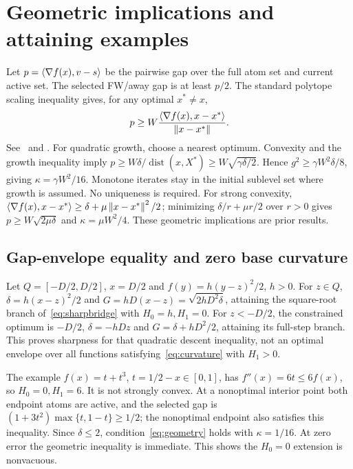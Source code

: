 \section{Geometric implications and attaining examples}
\label{app:geometry}
Let $p=\left\langle\nabla f(x),v-s\right\rangle$ be the pairwise gap over the full
atom set and current active set. The selected FW/away gap is at
least $p/2$. The standard polytope scaling inequality gives, for
any optimal $x^*\ne x$,
\[
 p\ge W\frac{\left\langle\nabla f(x),x-x^*\right\rangle}{\left\|x-x^*\right\|}.
\]
See~\cite[Theorem 3]{lacostejaggi} and
\cite[Lemmas 3.4 and 3.6]{restartfw}. For quadratic growth, choose
a nearest optimum. Convexity and the growth inequality imply
$p\ge W\delta/\operatorname{dist}(x,X^*)
\ge W\sqrt{\gamma\delta/2}$. Hence
$g^2\ge\gamma W^2\delta/8$, giving $\kappa=\gamma W^2/16$.
Monotone iterates stay in the initial sublevel set where growth is
assumed. No uniqueness is required. For strong convexity,
$\left\langle\nabla f(x),x-x^*\right\rangle\ge\delta+\mu\left\|x-x^*\right\|^2/2$;
minimizing $\delta/r+\mu r/2$ over $r>0$ gives
$p\ge W\sqrt{2\mu\delta}$ and $\kappa=\mu W^2/4$.
These geometric implications are prior results.

\subsection{Gap-envelope equality and zero base curvature}
\label{app:bridge}
Let $Q=[-D/2,D/2]$, $x=D/2$ and $f(y)=h(y-z)^2/2$, $h>0$.
For $z\in Q$, $\delta=h(x-z)^2/2$ and
$G=hD(x-z)=\sqrt{2hD^2\delta}$, attaining the square-root branch
of~\eqref{eq:sharpbridge} with $H_0=h,H_1=0$.
For $z<-D/2$, the constrained optimum is $-D/2$,
$\delta=-hDz$ and $G=\delta+hD^2/2$, attaining its full-step branch.
This proves sharpness for that quadratic descent inequality, not an
optimal envelope over all functions satisfying~\eqref{eq:curvature}
with $H_1>0$.

The example $f(x)=t+t^3$, $t=1/2-x\in[0,1]$, has
$f''(x)=6t\le6f(x)$, so $H_0=0,H_1=6$.
It is not strongly convex. At a nonoptimal interior point both
endpoint atoms are active, and the selected gap is
$(1+3t^2)\max\{t,1-t\}\ge1/2$; the nonoptimal endpoint also satisfies
this inequality. Since $\delta\le2$, condition~\eqref{eq:geometry}
holds with $\kappa=1/16$. At zero error the geometric inequality is
immediate. This shows the $H_0=0$ extension is nonvacuous.

